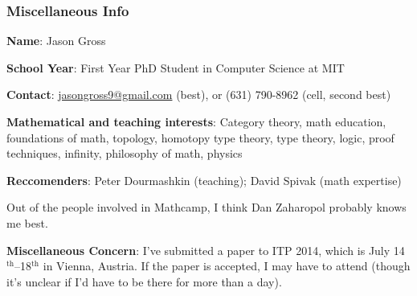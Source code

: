 \documentclass{article}
\begin{document}
\subsubsection*{Miscellaneous Info}
\noindent \textbf{Name}: Jason Gross \par
\noindent \textbf{School Year}: First Year PhD Student in Computer Science at MIT \par
\noindent \textbf{Contact}: \href{mailto:jasongross9@gmail.com}{jasongross9@gmail.com} (best), or %
(631) 790-8962%
\space (cell, second best) \par
\noindent \textbf{Mathematical and teaching interests}: Category theory, math education, foundations of math, topology, homotopy type theory, type theory, logic, proof techniques, infinity, philosophy of math, physics \par
\noindent \textbf{Reccomenders}: Peter Dourmashkin (teaching); David Spivak (math expertise) \par
\noindent Out of the people involved in Mathcamp, I think Dan Zaharopol probably knows me best. \par
\noindent \textbf{Miscellaneous Concern}: I've submitted a paper to ITP 2014, which is July 14$^\text{th}$--18$^\text{th}$ in Vienna, Austria.  If the paper is accepted, I may have to attend (though it's unclear if I'd have to be there for more than a day).
\end{document}
